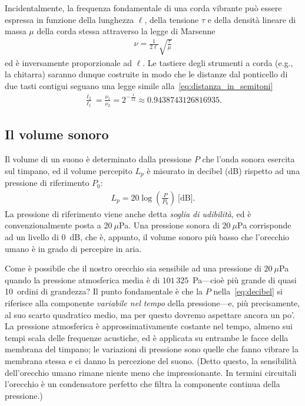 Incidentalmente, la frequenza fondamentale di una corda vibrante può essere
espressa in funzione della lunghezza $\ell$, della tensione $\tau$ e della
densità lineare di massa $\mu$ della corda stessa attraverso la legge di Marsenne
\begin{align}\label{eq:legge_di_marsenne}
  \nu = \frac{1}{2\ell}\sqrt{\frac{\tau}{\mu}}
\end{align}
ed è inversamente proporzionale ad $\ell$. Le tastiere degli strumenti a corda
(e.g., la chitarra) saranno dunque costruite in modo che le distanze dal
ponticello di due tasti contigui seguano una legge simile
alla~\eqref{eq:distanza_in_semitoni}
\begin{align}\label{eq:distanza_tasti}
  \frac{\ell_2}{\ell_1} = \frac{\nu_1}{\nu_2} =
  2^{-\frac{1}{12}} \approx 0.9438743126816935.
\end{align}


\subsection{Il volume sonoro}

Il volume di un suono è determinato dalla pressione $P$ che l'onda sonora esercita
sul timpano, ed il volume percepito $L_p$ è misurato in decibel (dB) rispetto ad
una pressione di riferimento $P_0$:
\begin{align}\label{eq:decibel}
  L_p = 20\log\left( \frac{P}{P_0} \right)~\text{[dB]}.
\end{align}
La pressione di riferimento viene anche detta \emph{soglia di udibilità}, ed è
convenzionalmente posta a $20~\mu$Pa. Una pressione sonora di $20~\mu$Pa
corrisponde ad un livello di $0$~dB, che è, appunto, il volume sonoro più basso
che l'orecchio umano è in grado di percepire in aria.

Come è possibile che il nostro orecchio sia sensibile ad una pressione di $20~\mu$Pa
quando la pressione atmosferica media è di $101\,325$~Pa---cioè più grande di quasi
10~ordini di grandezza?
Il punto fondamentale è che la $P$ nella~\eqref{eq:decibel} si riferisce alla
componente \emph{variabile nel tempo} della pressione---e, più precisamente,
al suo scarto quadratico medio, ma per questo dovremo aspettare ancora un po'.
La pressione atmosferica è approssimativamente costante nel tempo, almeno sui
tempi scala delle frequenze acustiche, ed è applicata su entrambe le facce
della membrana del timpano; le variazioni di pressione sono quelle che fanno
vibrare la membrana stessa e ci danno la percezione del suono. (Detto questo,
la sensibilità dell'orecchio umano rimane niente meno che impressionante.
In termini circuitali l'orecchio è un condensatore perfetto che filtra la
componente continua della pressione.)


